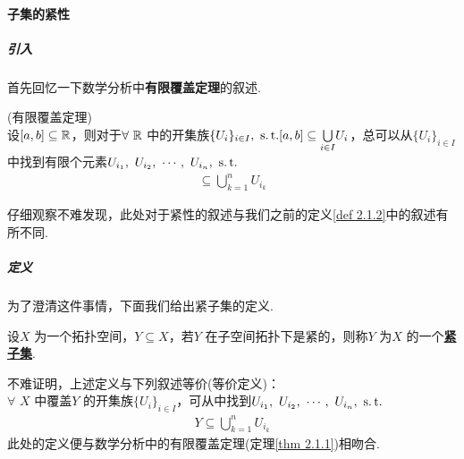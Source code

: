 \newpage
\paragraph{子集的紧性}
\subparagraph{引入}
	首先回忆一下数学分析中\textbf{有限覆盖定理}的叙述.
	\begin{thm}\label{thm 2.1.1}
		(有限覆盖定理)\\
		设$[a , b] \subseteq \mathbb{R}$，则对于$\forall \,\, \mathbb{R}$ 中的开集族$\{ U_i \}_{i \in I} , \,\, \operatorname{s.t.} [a , b] \subseteq \underset{i \in I}{\bigcup}{U_i}$，总可以从$\{ U_i \}_{i \in I}$ 中找到有限个元素$U_{i_1} , \,\, U_{i_2} , \,\, \cdots , \,\, U_{i_n} , \,\, \operatorname{s.t.}$
		\begin{align}
			[a , b] \subseteq \bigcup_{k = 1}^{n}{U_{i_k}}
		\end{align}
	\end{thm}
	仔细观察不难发现，此处对于紧性的叙述与我们之前的定义\ref{def 2.1.2}中的叙述有所不同.
	
\vspace*{2em}
\subparagraph{定义}
	为了澄清这件事情，下面我们给出紧子集的定义.
	\begin{defn}\label{def 2.1.3}
		设$X$ 为一个拓扑空间，$Y \subseteq X$，若$Y$ 在子空间拓扑下是紧的，则称$Y$ 为$X$ 的一个\underline{\textbf{紧子集}}.
		\begin{rmk}
			不难证明，上述定义与下列叙述等价(等价定义)：\\
			$\forall \,\, X$ 中覆盖$Y$ 的开集族$\{ U_i \}_{i \in I}$，可从中找到$U_{i_1} , \,\, U_{i_2} , \,\, \cdots , \,\, U_{i_n} , \,\, \operatorname{s.t.}$
			\begin{align}
				Y \subseteq \bigcup_{k = 1}^{n}{U_{i_k}}
			\end{align}
			此处的定义便与数学分析中的有限覆盖定理(定理\ref{thm 2.1.1})相吻合.
		\end{rmk}
	\end{defn}

\vspace*{2em}
